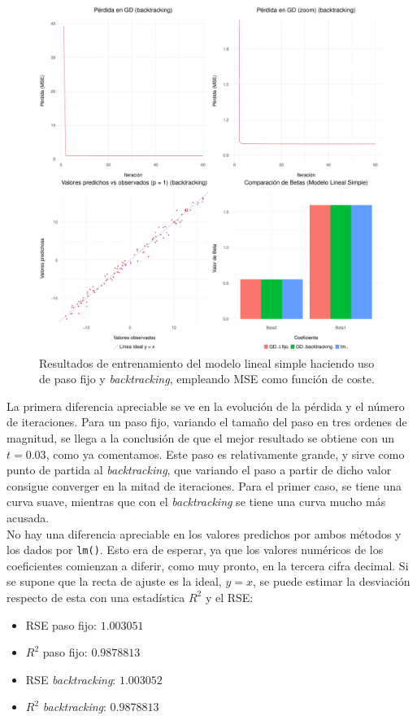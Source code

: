 \documentclass[11pt]{opticajnl}
\begin{document}
\begin{figure}[H]
\centering
\includegraphics[width=\textwidth]{fotos/plotmrsback.pdf}
\caption{Resultados de entrenamiento del modelo lineal simple haciendo uso de paso fijo y \textit{backtracking}, empleando MSE como función de coste.}
\label{fig:1}
\end{figure}


La primera diferencia apreciable se ve en la evolución de la pérdida y el número de iteraciones. Para un paso fijo, variando el tamaño del paso en tres ordenes de magnitud, se llega a la conclusión de que el mejor resultado se obtiene con un $t = 0.03$, como ya comentamos. Este paso es relativamente grande, y sirve como punto de partida al \textit{backtracking}, que variando el paso a partir de dicho valor consigue converger en la mitad de iteraciones. Para el primer caso, se tiene una curva suave, mientras que con el \textit{backtracking} se tiene una curva mucho más acusada. \\

No hay una diferencia apreciable en los valores predichos por ambos métodos y los dados por \texttt{lm()}. Esto era de esperar, ya que los valores numéricos de los coeficientes comienzan a diferir, como muy pronto, en la tercera cifra decimal. Si se supone que la recta de ajuste es la ideal, $y = x$, se puede estimar la desviación respecto de esta con una estadística $R^2$ y el RSE:
\begin{multicols}{2} 
\begin{itemize}
\item RSE paso fijo: $1.003051$ 
\item $R^2$ paso fijo: $0.9878813$ 
\item RSE \textit{backtracking}: $1.003052$
\item $R^2$ \textit{backtracking}: $0.9878813$
\end{itemize}
\end{multicols}
\end{document}
